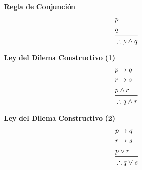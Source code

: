 \documentclass[12pt]{report}                                    %
\begin{document}
        \clearpage

        \large{\textbf{Regla de Conjunción}}
        \begin{equation*}
        \begin{split}
            &p                  \\
            &q                  \\
            \midrule
            &\therefore p \land q
        \end{split}
        \end{equation*}


        \bigskip

        \begin{multicols}{2}
            
            \large{\textbf{Ley del Dilema Constructivo (1)}}
                \begin{equation*}
                \begin{split}
                    &p \to q             \\
                    &r \to s             \\
                    &p \land r           \\
                    \midrule
                    &\therefore q \land r
                \end{split}
                \end{equation*}

            \large{\textbf{Ley del Dilema Constructivo (2)}}
                \begin{equation*}
                \begin{split}
                    &p \to q             \\
                    &r \to s             \\
                    &p \lor r            \\
                    \midrule
                    &\therefore q \lor s
                \end{split}
                \end{equation*}

        \end{multicols}

        \bigskip
\end{document}
